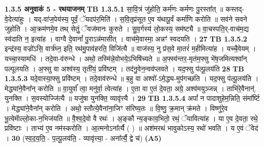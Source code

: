 \documentclass[17pt]{extarticle}
\begin{document}
                \textbf{ 1.3.5      अनुवाकं   5 - रथयाजनम्} \newline
                                \textbf{ TB 1.3.5.1} \newline
                  सा॒वि॒त्रं जु॑होति॒ कर्म॑णः कर्मणः पु॒रस्ता᳚त् ॥ कस्तद्-वे॒देत्या॑हुः । यद्-वा॑ज॒पेय॑स्य॒ पूर्वं॒ ॅयदप॑र॒मिति॑ । स॒वि॒तृप्र॑सूत ए॒व य॑थापू॒र्वं कर्मा॑णि करोति ॥ सव॑ने सवने जुहोति । आ॒क्रम॑णमे॒व तथ् सेतुं॒ ॅयज॑मानः कुरुते । सु॒व॒र्गस्य॑ लो॒कस्य॒ सम॑ष्ट्यै ॥ वा॒चस्पति॒र्-वाच॑म॒द्य स्व॑दाति न॒ इत्या॑ह । वाग्वै दे॒वानां᳚ पु॒राऽन्न॑मासीत् । वाच॑मे॒वास्मा॒ अन्नꣳ॑ स्वदयति । \textbf{ 27} \newline
                  \newline
                                \textbf{ TB 1.3.5.2} \newline
                  इन्द्र॑स्य॒ वज्रो॑ऽसि॒ वार्त्र॑घ्न॒ इति॒ रथ॑मु॒पाव॑हरति॒ विजि॑त्यै ॥ वाज॑स्य॒ नु प्र॑स॒वे मा॒तरं॑ म॒हीमित्या॑ह । यच्चै॒वेयम् । यच्चा॒स्यामधि॑ । तदे॒वा-व॑रुन्धे । अथो॒ तस्मि॑न्ने॒वोभये॒ऽभिषि॑च्यते ॥ अ॒फ्स्व॑न्तर॒-मृत॑म॒फ्सु भे॑ष॒जमित्यश्वा᳚न् पल्पूलयति । अ॒फ्सु वा अश्व॑स्य॒ तृती॑यं॒ प्रवि॑ष्टम् । तद॑नु॒वेन॒न्वव॑प्लवते । यद॒फ्सु प॑ल्पू॒लय॑ति \textbf{ 28} \newline
                  \newline
                                \textbf{ TB 1.3.5.3} \newline
                  यदे॒वास्या॒फ्सु प्रवि॑ष्टम् । तदे॒वाव॑रुन्धे ॥ ब॒हु वा अश्वो॑-ऽमे॒द्ध्य-मुप॑गच्छति । यद॒फ्सु प॑ल्पू॒लय॑ति । मेद्ध्या॑ने॒वैना᳚न् करोति ॥ वा॒युर्वा᳚ त्वा॒ मनु॑र्वा॒ त्वेत्या॑ह । ए॒ता वा ए॒तं दे॒वता॒ अग्रे॒ अश्व॑मयुञ्जन्न् । ताभि॑रे॒वैनान्॑. युनक्ति । स॒वस्योज्जि॑त्यै ॥ यजु॑षा युनक्ति॒ व्यावृ॑त्त्यै । \textbf{ 29} \newline
                  \newline
                                \textbf{ TB 1.3.5.4} \newline
                  अपां᳚ न पादाशुहेम॒न्निति॒ संमा᳚र्ष्टि । मेद्ध्या॑ने॒वैना᳚न् करोति । अथो॒ स्तौत्ये॒वैना॑ना॒जिꣳ स॑रिष्य॒तः ॥ वि॒ष्णु॒ क्र॒मान् क्र॑मते । विष्णु॑रे॒व भू॒त्वेमाॅल्लो॒का-न॒भिज॑यति ॥ वै॒श्व॒दे॒वो वै रथः॑ । अ॒ङ्कौ न्य॒ङ्काव॒भितो॒ रथं॒ ॅयावित्या॑ह । या ए॒व दे॒वता॒ रथे॒ प्रवि॑ष्टाः । ताभ्य॑ ए॒व नम॑स्करोति । आ॒त्मनोऽना᳚र्त्यै ( ) ॥ अश॑मरथं भावुकोऽस्य॒ रथो॑ भवति । य ए॒वं ॅवेद॑ । \textbf{ 30} \newline
                  \newline
                                    (स्व॒द॒य॒ति॒ - प॒ल्पू॒लय॑ति॒ - व्यावृ॑त्त्या॒ - अना᳚र्त्यै॒ द्वे च॑) \textbf{(A5)} \newline \newline
\end{document}
